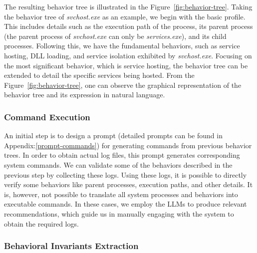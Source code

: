 The resulting behavior tree is illustrated in the Figure~\ref{fig:behavior-tree}. Taking the behavior tree of \textit{svchost.exe} as an example, we begin with the basic profile. This includes details such as the execution path of the process, its parent process (the parent process of \textit{svchost.exe} can only be \textit{services.exe}), and its child processes. Following this, we have the fundamental behaviors, such as service hosting, DLL loading, and service isolation exhibited by \textit{svchost.exe}. Focusing on the most significant behavior, which is service hosting, the behavior tree can be extended to detail the specific services being hosted. From the Figure~\ref{fig:behavior-tree}, one can observe the graphical representation of the behavior tree and its expression in natural language.


\subsubsection{Command Execution}

An initial step is to design a prompt (detailed prompts can be found in Appendix:\ref{prompt-commands}) for generating commands from previous behavior trees. In order to obtain actual log files, this prompt generates corresponding system commands. We can validate some of the behaviors described in the previous step by collecting these logs. Using these logs, it is possible to directly verify some behaviors like parent processes, execution paths, and other details. It is, however, not possible to translate all system processes and behaviors into executable commands. In these cases, we employ the LLMs to produce relevant recommendations, which guide us in manually engaging with the system to obtain the required logs.

\subsubsection{Behavioral Invariants Extraction}

